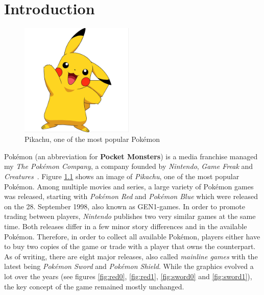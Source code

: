 
\chapter{Introduction}
\label{ch:introduction}

\begin{figure}
    \begin{center}
      \includegraphics[width=0.48\textwidth]{images/pikachu.png}
    \end{center}
    \caption{Pikachu, one of the most popular Pokémon~\autocite{Fandom:AshsPikachu}}
    \label{fig:pikachu-image}
\end{figure}
Pokémon (an abbreviation for \textbf{Pocket Monsters}) is a media franchise managed my \textit{The Pokémon Company}, a company
founded by \textit{Nintendo}, \textit{Game Freak} and \textit{Creatures}~\autocite{Wikipedia:Pokemon}. Figure \ref{fig:pikachu-image} shows an image of
\textit{Pikachu}, one of the most popular Pokémon. Among multiple movies and series, a large variety of Pokémon games was released, starting with
\textit{Pokémon Red} and \textit{Pokémon Blue} which were released on the 28. September 1998, also known as \ac{GEN1}-games. In order to promote
trading between players, \textit{Nintendo} publishes two very similar games at the same time. 
Both releases differ in a few minor story differences and in the available Pokémon. Therefore, in order to collect all available Pokémon,
players either have to buy two copies of the game or trade with a player that owns the counterpart. As of writing, there are eight major
releases, also called \textit{mainline games} with the latest being \textit{Pokémon Sword} and \textit{Pokémon Shield}. While the graphics
evolved a lot over the years (see figures \ref{fig:red0}, \ref{fig:red1}, \ref{fig:sword0} and \ref{fig:sword1}), the key concept of the 
game remained mostly unchanged.
